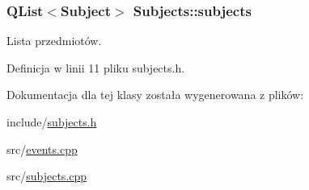 \hypertarget{classSubjects_a8e97b147f9bdef32d49612c04b87e348}{
\subsubsection[{subjects}]{\setlength{\rightskip}{0pt plus 5cm}QList$<${\bf Subject}$>$ {\bf Subjects::subjects}}}
\label{classSubjects_a8e97b147f9bdef32d49612c04b87e348}


Lista przedmiotów. 



Definicja w linii 11 pliku subjects.h.



Dokumentacja dla tej klasy została wygenerowana z plików:\begin{DoxyCompactItemize}
\item 
include/\hyperlink{subjects_8h}{subjects.h}\item 
src/\hyperlink{events_8cpp}{events.cpp}\item 
src/\hyperlink{subjects_8cpp}{subjects.cpp}\end{DoxyCompactItemize}
